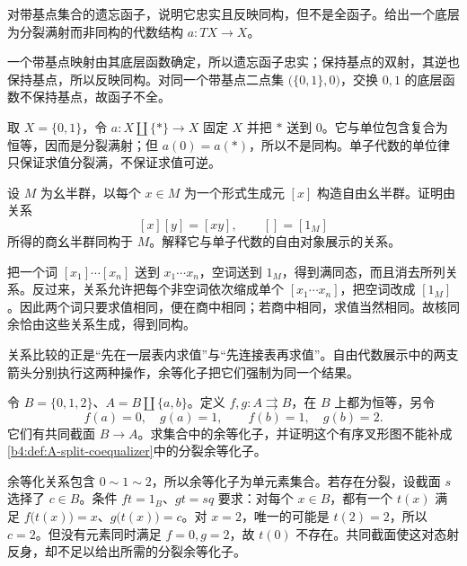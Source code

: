 \begin{exercise}\label{b4:ex:A-forgetful-not-full}
	对带基点集合的遗忘函子，说明它忠实且反映同构，但不是全函子。给出一个底层为分裂满射而非同构的代数结构 \(a:TX\to X\)。
\end{exercise}
\begin{solution}
	一个带基点映射由其底层函数确定，所以遗忘函子忠实；保持基点的双射，其逆也保持基点，所以反映同构。对同一个带基点二点集 \(\bigl(\{0,1\},0\bigr)\)，交换 \(0,1\) 的底层函数不保持基点，故函子不全。

	取 \(X=\{0,1\}\)，令 \(a:X\amalg\{*\}\to X\) 固定 \(X\) 并把 \(*\) 送到 \(0\)。它与单位包含复合为恒等，因而是分裂满射；但 \(a(0)=a(*)\)，所以不是同构。单子代数的单位律只保证求值分裂满，不保证求值可逆。
\end{solution}

\begin{exercise}\label{b4:ex:A-monoid-presentation}
	设 \(M\) 为幺半群，以每个 \(x\in M\) 为一个形式生成元 \([x]\) 构造自由幺半群。证明由关系
	\[
		[x][y]=[xy],\qquad []=[1_M]
	\]
	所得的商幺半群同构于 \(M\)。解释它与单子代数的自由对象展示的关系。
\end{exercise}
\begin{solution}
	把一个词 \([x_1]\cdots[x_n]\) 送到 \(x_1\cdots x_n\)，空词送到 \(1_M\)，得到满同态，而且消去所列关系。反过来，关系允许把每个非空词依次缩成单个 \([x_1\cdots x_n]\)，把空词改成 \([1_M]\)。因此两个词只要求值相同，便在商中相同；若商中相同，求值当然相同。故核同余恰由这些关系生成，得到同构。

	关系比较的正是“先在一层表内求值”与“先连接表再求值”。自由代数展示中的两支箭头分别执行这两种操作，余等化子把它们强制为同一个结果。
\end{solution}

\begin{exercise}\label{b4:ex:A-reflexive-not-split}
	令 \(B=\{0,1,2\}\)、\(A=B\amalg\{a,b\}\)。定义 \(f,g:A\rightrightarrows B\)，在 \(B\) 上都为恒等，另令
	\[
		f(a)=0,\quad g(a)=1,\qquad f(b)=1,\quad g(b)=2.
	\]
	它们有共同截面 \(B\to A\)。求集合中的余等化子，并证明这个有序叉形图不能补成\cref{b4:def:A-split-coequalizer}中的分裂余等化子。
\end{exercise}
\begin{solution}
	余等化关系包含 \(0\sim1\sim2\)，所以余等化子为单元素集合。若存在分裂，设截面 \(s\) 选择了 \(c\in B\)。条件 \(ft=1_B\)、\(gt=sq\) 要求：对每个 \(x\in B\)，都有一个 \(t(x)\) 满足 \(f\bigl(t(x)\bigr)=x\)、\(g\bigl(t(x)\bigr)=c\)。对 \(x=2\)，唯一的可能是 \(t(2)=2\)，所以 \(c=2\)。但没有元素同时满足 \(f=0,g=2\)，故 \(t(0)\) 不存在。共同截面使这对态射反身，却不足以给出所需的分裂余等化子。
\end{solution}

